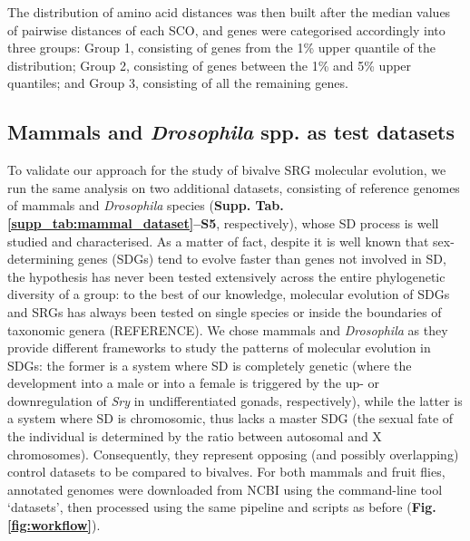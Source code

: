 \documentclass[../main.tex]{subfiles}
\begin{document}
The distribution of amino acid distances was then built after the median values of pairwise distances of each SCO, and genes were categorised accordingly into three groups: Group 1, consisting of genes from the 1\% upper quantile of the distribution; Group 2, consisting of genes between the 1\% and 5\% upper quantiles; and Group 3, consisting of all the remaining genes.

\subsection{Mammals and \textit{Drosophila} spp. as test datasets}
To validate our approach for the study of bivalve SRG molecular evolution, we run the same analysis on two additional datasets, consisting of reference genomes of mammals and \textit{Drosophila} species (\textbf{Supp. Tab. \ref{supp_tab:mammal_dataset}--S5}, respectively), whose SD process is well studied and characterised. As a matter of fact, despite it is well known that sex-determining genes (SDGs) tend to evolve faster than genes not involved in SD, the hypothesis has never been tested extensively across the entire phylogenetic diversity of a group: to the best of our knowledge, molecular evolution of SDGs and SRGs has always been tested on single species or inside the boundaries of taxonomic genera (REFERENCE). We chose mammals and \textit{Drosophila} as they provide different frameworks to study the patterns of molecular evolution in SDGs: the former is a system where SD is completely genetic (where the development into a male or into a female is triggered by the up- or downregulation of \textit{Sry} in undifferentiated gonads, respectively), while the latter is a system where SD is chromosomic, thus lacks a master SDG (the sexual fate of the individual is determined by the ratio between autosomal and X chromosomes). Consequently, they represent opposing (and possibly overlapping) control datasets to be compared to bivalves. For both mammals and fruit flies, annotated genomes were downloaded from NCBI using the command-line tool ‘datasets’, then processed using the same pipeline and scripts as before (\textbf{Fig. \ref{fig:workflow}}).
\end{document}
